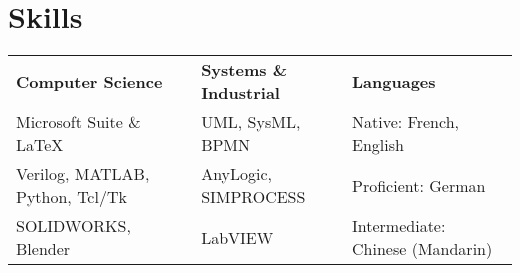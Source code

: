 \documentclass[10pt]{article}
\begin{document}
\section*{Skills}
\label{sec:orgaac63db}

\begin{center}
\begin{tabular}{l|l|l}
\large \textbf{Computer Science} & \large \textbf{Systems \& Industrial} & \large \textbf{Languages}\\
Microsoft Suite \& \LaTeX & UML, SysML, BPMN & Native: French, English\\
Verilog, MATLAB, Python, Tcl/Tk & AnyLogic, SIMPROCESS & Proficient: German\\
SOLIDWORKS, Blender & LabVIEW & Intermediate: Chinese (Mandarin)\\
\end{tabular}

\end{center}
\end{document}
